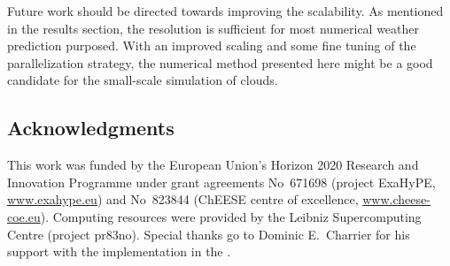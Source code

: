 \documentclass[runningheads]{llncs}
\begin{document}
Future work should be directed towards improving the scalability.
As mentioned in the results section, the resolution is sufficient for most numerical weather prediction purposed.
With an improved \amr{} scaling and some fine tuning of the parallelization strategy, the numerical method presented here might be a good candidate for the small-scale simulation of clouds.

\subsection*{Acknowledgments}
This work was funded by the European Union’s Horizon 2020 Research and Innovation Programme under grant agreements 
No~671698 (project ExaHyPE, \url{www.exahype.eu}) and 
No~823844 (ChEESE centre of excellence, \url{www.cheese-coe.eu}).
Computing resources were provided by the Leibniz Supercomputing Centre (project pr83no).
Special thanks go to Dominic E.\ Charrier for his support with the implementation in the \exahypeengine{}.

%

{}
\end{document}

